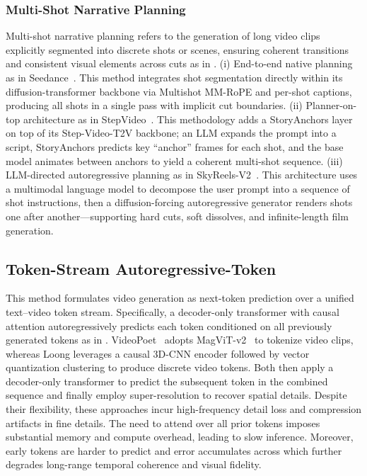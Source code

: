 \subsubsection{Multi-Shot Narrative Planning}
\label{sec:arch-narrative}
Multi-shot narrative planning refers to the generation of long video clips explicitly segmented into discrete shots or scenes, ensuring coherent transitions and consistent visual elements across cuts as in \cite{gao2025seedance, chen2025skyreelsv2, huang2025stepvideo}. (i) End-to-end native planning as in Seedance~\cite{gao2025seedance}. This method integrates shot segmentation directly within its diffusion-transformer backbone via Multishot MM-RoPE and per-shot captions, producing all shots in a single pass with implicit cut boundaries. (ii) Planner-on-top architecture as in StepVideo~\cite{huang2025stepvideo}. This methodology adds a StoryAnchors layer on top of its Step-Video-T2V backbone; an LLM expands the prompt into a script, StoryAnchors predicts key “anchor” frames for each shot, and the base model animates between anchors to yield a coherent multi-shot sequence. (iii) LLM-directed autoregressive planning as in SkyReels-V2~\cite{chen2025skyreelsv2}. This architecture uses a multimodal language model to decompose the user prompt into a sequence of shot instructions, then a diffusion-forcing autoregressive generator renders shots one after another—supporting hard cuts, soft dissolves, and infinite-length film generation.



\subsection{Token-Stream Autoregressive-Token}
\label{sec:arch-token}

This method formulates video generation as next-token prediction over a unified text–video token stream. Specifically, a decoder-only transformer with causal attention autoregressively predicts each token conditioned on all previously generated tokens as in \cite{wang2024loong, singer2023videopoet}. VideoPoet~\cite{singer2023videopoet} adopts MagViT-v2~\cite{yu2023magvitv2} to tokenize video clips, whereas Loong \cite{wang2024loong} leverages a causal 3D-CNN encoder followed by vector quantization clustering to produce discrete video tokens. Both then apply a decoder-only transformer to predict the subsequent token in the combined sequence and finally employ super-resolution to recover spatial details. Despite their flexibility, these approaches incur high-frequency detail loss and compression artifacts in fine details. The need to attend over all prior tokens imposes substantial memory and compute overhead, leading to slow inference. Moreover, early tokens are harder to predict and error accumulates across which further degrades long-range temporal coherence and visual fidelity.

